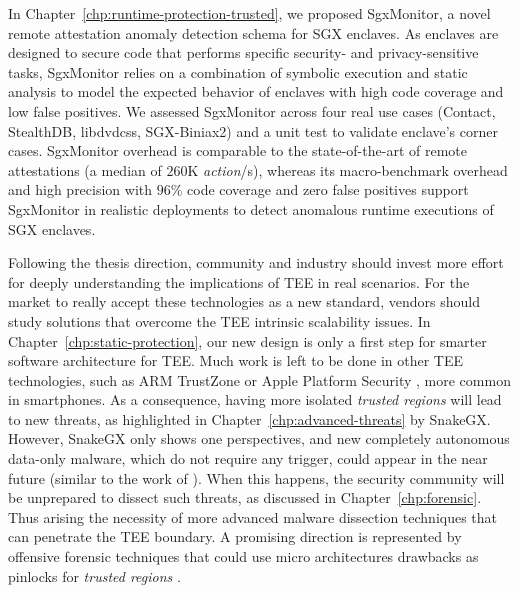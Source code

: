 In Chapter~\ref{chp:runtime-protection-trusted}, we proposed SgxMonitor, a 
novel remote attestation anomaly detection schema for SGX enclaves. As enclaves 
are designed to secure code that performs specific security- and 
privacy-sensitive tasks, SgxMonitor relies on a combination of symbolic 
execution and static analysis to model the expected behavior of enclaves with 
high code coverage and low false positives.  
We assessed SgxMonitor across four real use cases (\ie \textsf{Contact}, 
\textsf{StealthDB}, \textsf{libdvdcss}, \textsf{SGX-Biniax2}) and a 
\textsf{unit test} to validate enclave's corner cases. SgxMonitor overhead is 
comparable to the state-of-the-art of remote attestations (a median of $260$K
\emph{action}/s), whereas its macro-benchmark overhead and high precision
with $96$\% code coverage and zero false positives support SgxMonitor in 
realistic deployments to detect anomalous runtime executions of SGX enclaves.

\vspace{0.3cm}
Following the thesis direction, community and industry should invest more 
effort for deeply understanding the implications of TEE in real scenarios.
For the market to really accept these technologies as a new standard, vendors 
should study solutions that overcome the TEE intrinsic scalability issues. 
In Chapter~\ref{chp:static-protection}, our new design is only a first step for 
smarter software architecture for TEE.
Much work is left to be done in other TEE technologies, such as ARM TrustZone 
\citep{arm-trustzone} or Apple Platform Security \citep{apple-enclave}, more 
common in smartphones.
As a consequence, having more isolated \emph{trusted regions} will lead to new 
threats, as highlighted in Chapter~\ref{chp:advanced-threats} by SnakeGX.
However, SnakeGX only shows one perspectives, and new completely autonomous 
data-only malware, which do not require any trigger, could appear in the near 
future (similar to the work of \cite{vogl2014persistent}).
When this happens, the security community will be unprepared to dissect such 
threats, as discussed in Chapter~\ref{chp:forensic}.
Thus arising the necessity of more advanced malware dissection techniques that
can penetrate the TEE boundary. A promising direction is represented by 
offensive forensic techniques that could use micro 
architectures drawbacks as pinlocks for \emph{trusted regions} 
\citep{offensiveforensic}.

